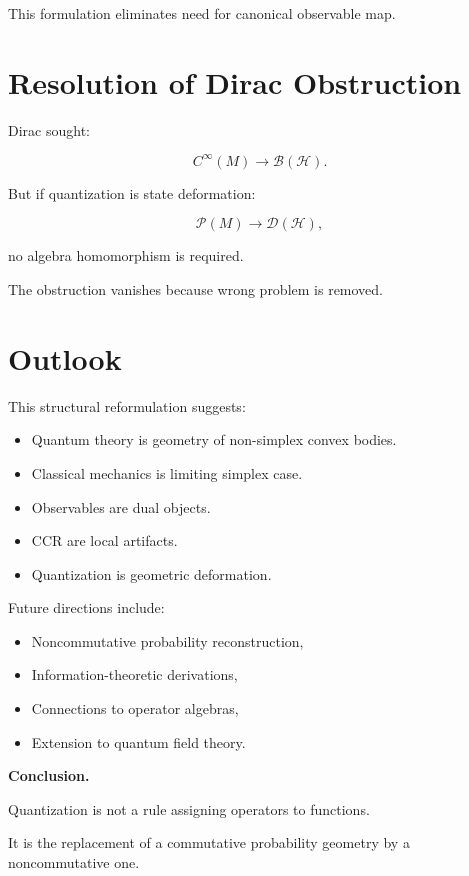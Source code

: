 \documentclass[11pt]{book}
\begin{document}
This formulation eliminates need for canonical observable map.

\section{Resolution of Dirac Obstruction}

Dirac sought:

\[
C^\infty(M) \to \mathcal{B}(\mathcal{H}).
\]

But if quantization is state deformation:

\[
\mathcal{P}(M)
\to
\mathcal{D}(\mathcal{H}),
\]

no algebra homomorphism is required.

The obstruction vanishes because wrong problem is removed.

\section{Outlook}

This structural reformulation suggests:

\begin{itemize}
\item Quantum theory is geometry of non-simplex convex bodies.
\item Classical mechanics is limiting simplex case.
\item Observables are dual objects.
\item CCR are local artifacts.
\item Quantization is geometric deformation.
\end{itemize}

Future directions include:

\begin{itemize}
\item Noncommutative probability reconstruction,
\item Information-theoretic derivations,
\item Connections to operator algebras,
\item Extension to quantum field theory.
\end{itemize}

\bigskip

\noindent
\textbf{Conclusion.}

Quantization is not a rule assigning operators to functions.

It is the replacement of a commutative probability geometry by a noncommutative one.
\end{document}
